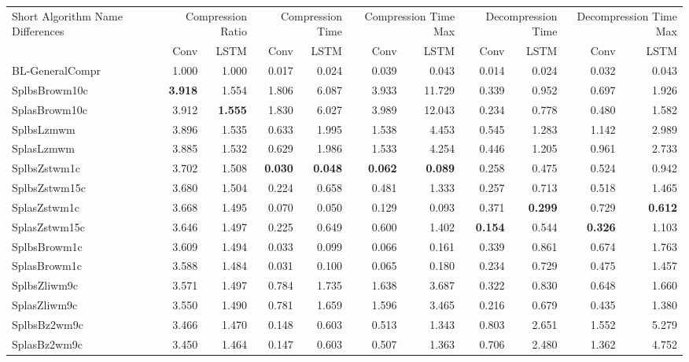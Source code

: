 \begin{tabular}{lrrrrrrrrrr}
\toprule
\multicolumn{1}{p{2.5cm}}{Short Algorithm Name Differences} & \multicolumn{2}{p{1.8cm}}{Compression Ratio} & \multicolumn{2}{p{1.8cm}}{Compression Time} & \multicolumn{2}{p{1.8cm}}{Compression Time Max} & \multicolumn{2}{p{1.8cm}}{Decompression Time} & \multicolumn{2}{p{1.8cm}}{Decompression Time Max} \\
 & Conv & LSTM & Conv & LSTM & Conv & LSTM & Conv & LSTM & Conv & LSTM \\
\midrule
BL-GeneralCompr & 1.000 & 1.000 & 0.017 & 0.024 & 0.039 & 0.043 & 0.014 & 0.024 & 0.032 & 0.043 \\
SplbsBrowm10c & \bfseries 3.918 & 1.554 & 1.806 & 6.087 & 3.933 & 11.729 & 0.339 & 0.952 & 0.697 & 1.926 \\
SplasBrowm10c & 3.912 & \bfseries 1.555 & 1.830 & 6.027 & 3.989 & 12.043 & 0.234 & 0.778 & 0.480 & 1.582 \\
SplbsLzmwm & 3.896 & 1.535 & 0.633 & 1.995 & 1.538 & 4.453 & 0.545 & 1.283 & 1.142 & 2.989 \\
SplasLzmwm & 3.885 & 1.532 & 0.629 & 1.986 & 1.533 & 4.254 & 0.446 & 1.205 & 0.961 & 2.733 \\
SplbsZstwm1c & 3.702 & 1.508 & \bfseries 0.030 & \bfseries 0.048 & \bfseries 0.062 & \bfseries 0.089 & 0.258 & 0.475 & 0.524 & 0.942 \\
SplbsZstwm15c & 3.680 & 1.504 & 0.224 & 0.658 & 0.481 & 1.333 & 0.257 & 0.713 & 0.518 & 1.465 \\
SplasZstwm1c & 3.668 & 1.495 & 0.070 & 0.050 & 0.129 & 0.093 & 0.371 & \bfseries 0.299 & 0.729 & \bfseries 0.612 \\
SplasZstwm15c & 3.646 & 1.497 & 0.225 & 0.649 & 0.600 & 1.402 & \bfseries 0.154 & 0.544 & \bfseries 0.326 & 1.103 \\
SplbsBrowm1c & 3.609 & 1.494 & 0.033 & 0.099 & 0.066 & 0.161 & 0.339 & 0.861 & 0.674 & 1.763 \\
SplasBrowm1c & 3.588 & 1.484 & 0.031 & 0.100 & 0.065 & 0.180 & 0.234 & 0.729 & 0.475 & 1.457 \\
SplbsZliwm9c & 3.571 & 1.497 & 0.784 & 1.735 & 1.638 & 3.687 & 0.322 & 0.830 & 0.648 & 1.660 \\
SplasZliwm9c & 3.550 & 1.490 & 0.781 & 1.659 & 1.596 & 3.465 & 0.216 & 0.679 & 0.435 & 1.380 \\
SplbsBz2wm9c & 3.466 & 1.470 & 0.148 & 0.603 & 0.513 & 1.343 & 0.803 & 2.651 & 1.552 & 5.279 \\
SplasBz2wm9c & 3.450 & 1.464 & 0.147 & 0.603 & 0.507 & 1.363 & 0.706 & 2.480 & 1.362 & 4.752 \\
\bottomrule
\end{tabular}
